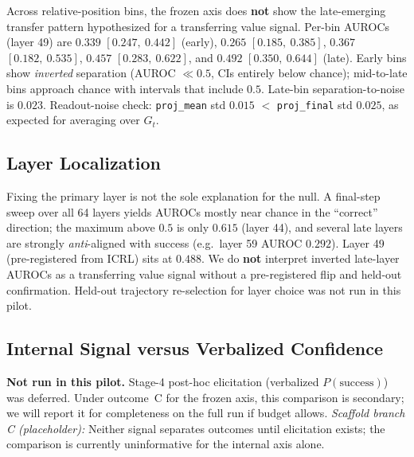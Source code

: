 \documentclass{article}
\begin{document}
Across relative-position bins, the frozen axis does \textbf{not} show the late-emerging transfer pattern hypothesized for a transferring value signal.
Per-bin AUROCs (layer 49) are
$0.339$ $[0.247,\ 0.442]$ (early),
$0.265$ $[0.185,\ 0.385]$,
$0.367$ $[0.182,\ 0.535]$,
$0.457$ $[0.283,\ 0.622]$,
and $0.492$ $[0.350,\ 0.644]$ (late).
Early bins show \emph{inverted} separation (AUROC $\ll 0.5$, CIs entirely below chance); mid-to-late bins approach chance with intervals that include $0.5$.
Late-bin separation-to-noise is $0.023$.
Readout-noise check: \texttt{proj\_mean} std $0.015$ $<$ \texttt{proj\_final} std $0.025$, as expected for averaging over $G_t$.


\subsection{Layer Localization}
\label{sec:results-layers}

Fixing the primary layer is not the sole explanation for the null.
A final-step sweep over all 64 layers yields AUROCs mostly near chance in the ``correct'' direction; the maximum above $0.5$ is only $0.615$ (layer 44), and several late layers are strongly \emph{anti}-aligned with success (e.g.\ layer 59 AUROC $0.292$).
Layer 49 (pre-registered from ICRL) sits at $0.488$.
We do \textbf{not} interpret inverted late-layer AUROCs as a transferring value signal without a pre-registered flip and held-out confirmation.
Held-out trajectory re-selection for layer choice was not run in this pilot.


\subsection{Internal Signal versus Verbalized Confidence}
\label{sec:results-elicited}

\textbf{Not run in this pilot.}
Stage-4 post-hoc elicitation (verbalized $P(\mathrm{success})$) was deferred.
Under outcome~C for the frozen axis, this comparison is secondary; we will report it for completeness on the full run if budget allows.
\textit{Scaffold branch C (placeholder):} Neither signal separates outcomes until elicitation exists; the comparison is currently uninformative for the internal axis alone.
\end{document}
